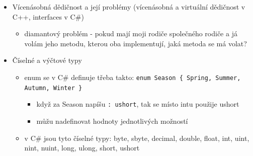 \begin{itemize}
\begin{itemize}
\begin{itemize}
\item tzv. duck typing
\item v C\# lze aktivovat klíčovým slovem \texttt{dynamic}
\item za jistou formu dynamického typování lze považovat i používání obecných rozhraní nebo rodičovských typů (např. \texttt{object})
\end{itemize}
\item statický polymorfismus se implementuje tak, že přetížíme metodu nebo operátor nebo že zakryjeme rodičovskou metodu
\item dynamický polymorfismus funguje pomocí virtuálních metod
\item při volání interfacové metody je důležité, která třída ji implementuje
\begin{itemize}
\item koncept virtuálních metod s interfacy přímo nesouvisí, ale požadavek interfacu můžeme uspokojit virtuální metodou
\item poznámka: interfacová metoda se dá implementovat explicitně
\end{itemize}
\end{itemize}
\item Vícenásobná dědičnost a její problémy (vícenásobná a virtuální dědičnost v C++, interfaces v C\#)
\begin{itemize}
\item diamantový problém - pokud mají moji rodiče společného rodiče a já volám jeho metodu, kterou oba implementují, jaká metoda se má volat?
\end{itemize}
\item Číselné a výčtové typy
\begin{itemize}
\item enum se v C\# definuje třeba takto: \texttt{enum \allowbreak{}Season \allowbreak{}\{ \allowbreak{}Spring,\allowbreak{} \allowbreak{}Summer,\allowbreak{} \allowbreak{}Autumn,\allowbreak{} \allowbreak{}Winter \allowbreak{}\}\allowbreak{}}
\begin{itemize}
\item když za Season napíšu \texttt{: \allowbreak{}ushort}, tak se místo intu použije ushort
\item můžu nadefinovat hodnoty jednotlivých možností
\end{itemize}
\item v C\# jsou tyto číselné typy: byte, sbyte, decimal, double, float, int, uint, nint, nuint, long, ulong, short, ushort
\begin{itemize}

\end{itemize}
\end{itemize}
\end{itemize}

